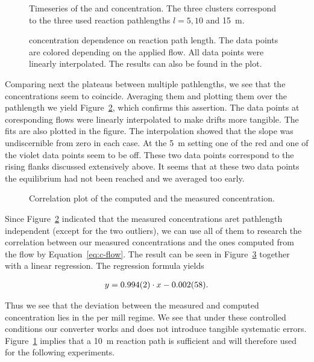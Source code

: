 \begin{figure}[htbp]
  \centering
  
  \hfill
  
  \caption{Timeseries of the  and  concentration. The
    three clusters correspond to the three used reaction pathlengths
    $l = 5, 10$ and \SI{15}{\meter}.}
  \label{fig:ts}
\end{figure}
\begin{figure}[H]
  \centering
  
  \caption{ concentration dependence on reaction path
    length. The data points are colored depending on the applied
     flow. All data points were linearly interpolated. The
    results can also be found in the plot.}
  \label{fig:no-length}
\end{figure}

Comparing next the  plateaus between multiple pathlengths, we
see that the concentrations seem to coincide. Averaging them and
plotting them over the pathlength we yield Figure~\ref{fig:no-length},
which confirms this assertion. The data points at coresponding flows
were linearly interpolated to make drifts more tangible. The fits are
also plotted in the figure. The interpolation showed that the slope
was undiscernible from zero in each case. At the \SI{5}{\meter}
setting one of the red and one of the violet data points seem to be
off. These two data points correspond to the rising flanks discussed
extensively above. It seems that at these two data points the
equilibrium had not been reached and we averaged too early.

\begin{figure}[htbp]
  \centering
  
  \caption{Correlation plot of the computed and the measured 
    concentration.}
  \label{fig:no-calib}
\end{figure}

Since Figure~\ref{fig:no-length} indicated that the measured
concentrations aret pathlength independent (except for the two outliers),
we can use all of them to research the correlation between our
measured concentrations and the ones computed from the flow by
Equation~\eqref{eq:c-flow}. The result can be seen in
Figure~\ref{fig:no-calib} together with a linear regression. The
regression formula yields

\begin{align*}
  y = \num{0.994 \pm 0.002}  \cdot x -\num{0.002 \pm 0.058}.
\end{align*}

Thus we see that the deviation between the measured and computed
concentration lies in the per mill regime. We see that under these
controlled conditions our converter works and does not introduce
tangible systematic errors. Figure~\ref{fig:ts} implies that a
\SI{10}{\meter} reaction path is sufficient and will therefore used
for the following experiments.

